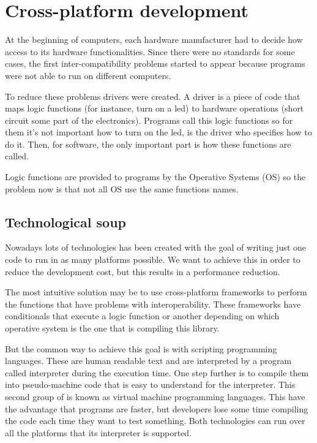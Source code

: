 \chapter{Cross-platform development}

At the beginning of computers, each hardware manufacturer had to decide how
access to its hardware functionalities. Since there were no standards for some
cases, the first inter-compatibility problems started to appear because
programs were not able to run on different computers.

To reduce these problems drivers were created. A driver is a piece of code that 
maps logic functions (for instance, turn on a led) to hardware operations 
(short circuit some part of the electronics). Programs call this logic functions
so for them it's not important how to turn on the led, is the driver who 
specifies how to do it. Then, for software, the only important part is how these
functions are called.

Logic functions are provided to programs by the Operative Systems (OS) so the 
problem now is that not all OS use the same functions names.

\section{Technological soup}

Nowadays lots of technologies has been created with the goal of writing just
one code to run in as many platforms possible. We want to achieve this
in order to reduce the development cost, but this results in a performance
reduction.

The most intuitive solution may be to use cross-platform frameworks to perform
the functions that have problems with interoperability. These frameworks have 
conditionals that execute a logic function or another depending on which 
operative system is the one that is compiling this library.

But the common way to achieve this goal is with scripting programming
languages. These are human readable text and are interpreted by a program
called interpreter during the execution time. One step further is to compile
them into pseudo-machine code that is easy to understand for the interpreter.
This second group of is known as virtual machine programming languages. This
have the advantage that programs are faster, but developers lose some time
compiling the code each time they want to test something. Both technologies can
run over all the platforms that its interpreter is supported.

